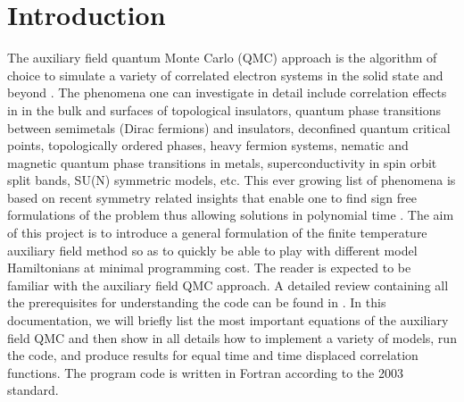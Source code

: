 
\section{Introduction}\label{sec:intro}

The auxiliary field quantum Monte Carlo (QMC) approach is the algorithm of choice to simulate a variety of correlated electron systems in the solid state and beyond \cite{Blankenbecler81,Assaad08_rev}.  
The phenomena  one can investigate in detail include correlation effects in in the bulk and surfaces of topological insulators, quantum phase transitions between semimetals (Dirac fermions)  and insulators,  
deconfined quantum critical points, topologically ordered phases, heavy fermion systems, nematic and magnetic quantum phase transitions in metals,   superconductivity in spin orbit split bands, SU(N) symmetric models,  etc. 
This ever growing list of phenomena is based on  recent symmetry related insights that enable one to  find  sign free formulations of the  problem thus allowing solutions in polynomial time \cite{Wu04,Wei16}.   
The aim of this project is to introduce a general formulation of the finite temperature  auxiliary field method  so as to quickly be able to play with different model Hamiltonians  at  minimal programming cost.      
The reader is expected to be familiar with the auxiliary field QMC  approach. A detailed review containing all  the prerequisites for understanding  the code can be found in \cite{Assaad08_rev}.    
In this documentation, we will briefly list the most important equations of the auxiliary field QMC and then show in all details how to implement a variety of models, run the code, and produce  results for  equal time and time displaced correlation functions. 
The program code is written in Fortran according to the 2003 standard. 


